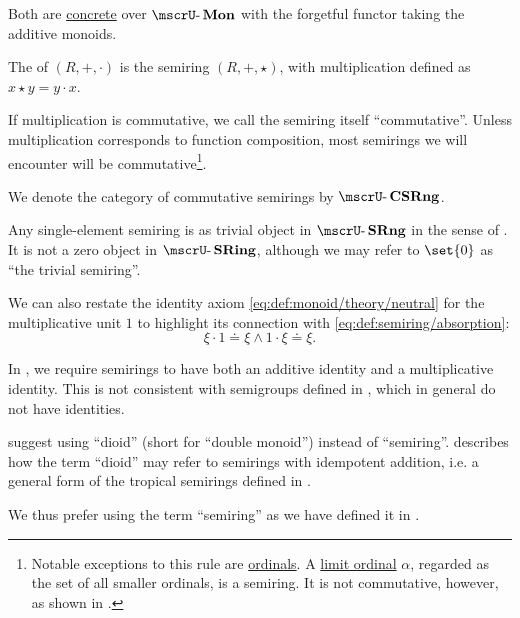 \begin{definition}
\begin{thmenum}
    Both are \hyperref[def:concrete_category]{concrete} over \hyperref[def:monoid/category]{\( \ucat{Mon} \)} with the forgetful functor taking the additive monoids.

     The  of \( (R, +, \cdot) \) is the semiring \( (R, +, \star) \), with multiplication defined as \( x \star y = y \cdot x \).

     If multiplication is commutative, we call the semiring itself \enquote{commutative}. Unless multiplication corresponds to function composition, most semirings we will encounter will be commutative\footnote{
    Notable exceptions to this rule are \hyperref[def:ordinal]{ordinals}. A \hyperref[def:successor_and_limit_ordinal]{limit ordinal} \( \alpha \), regarded as the set of all smaller ordinals, is a semiring. It is not commutative, however, as shown in .}.

    We denote the category of commutative semirings by \( \ucat{CSRng} \).

     Any single-element semiring is as trivial object in \( \ucat{SRng} \) in the sense of . It is not a zero object in \( \ucat{SRing} \), although we may refer to \( \set{ 0 } \) as \enquote{the trivial semiring}.
  \end{thmenum}
\end{definition}
\begin{comments}
  \item We can also restate the identity axiom \eqref{eq:def:monoid/theory/neutral} for the multiplicative unit \( 1 \) to highlight its connection with \eqref{eq:def:semiring/absorption}:
  \begin{equation}\label{eq:def:semiring/identity}
    \xi \cdot 1 \doteq \xi \wedge 1 \cdot \xi \doteq \xi.
  \end{equation}
\end{comments}

\begin{remark}\label{rem:semiring_etymology}
  In , we require semirings to have both an additive identity and a multiplicative identity. This is not consistent with semigroups defined in , which in general do not have identities.

   suggest using \enquote{dioid} (short for \enquote{double monoid}) instead of \enquote{semiring}.  describes how the term \enquote{dioid} may refer to semirings with idempotent addition, i.e. a general form of the tropical semirings defined in .

  We thus prefer using the term \enquote{semiring} as we have defined it in .
\end{remark}

